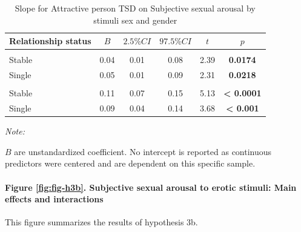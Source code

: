 \documentclass[
  bookmarksnumbered]{article}
\begin{document}
\begin{table}[H]
\centering
\caption{\label{tab:unnamed-chunk-31}Slope for Attractive person TSD on 
        Subjective sexual arousal by stimuli sex and gender}
\centering
\begin{threeparttable}
\begin{tabular}[t]{lccccc}
\toprule
Relationship status & $B$ & $2.5\% CI$ & $97.5\% CI$ & $t$ & $p$\\
\midrule
\addlinespace[0.3em]
\multicolumn{6}{l}{\cellcolor{lightgray}{Gender: Women}}\\
\hspace{1em}Stable & 0.04 & 0.01 & 0.08 & 2.39 & \textbf{0.0174}\\
\hspace{1em}Single & 0.05 & 0.01 & 0.09 & 2.31 & \textbf{0.0218}\\
\addlinespace[0.3em]
\multicolumn{6}{l}{\cellcolor{lightgray}{Gender: Men}}\\
\hspace{1em}Stable & 0.11 & 0.07 & 0.15 & 5.13 & \textbf{< 0.0001}\\
\hspace{1em}Single & 0.09 & 0.04 & 0.14 & 3.68 & \textbf{< 0.001}\\
\bottomrule
\end{tabular}
\begin{tablenotes}[para]
\item \textit{Note: } 
\item $B$ are unstandardized coefficient.
           No intercept is reported as continuous predictors were centered
           and are dependent on this specific sample.
\end{tablenotes}
\end{threeparttable}
\end{table}

\paragraph{Figure \ref{fig:fig-h3b}. Subjective sexual arousal to erotic stimuli: Main effects and interactions}\label{figure-reffigfig-h3b.-subjective-sexual-arousal-to-erotic-stimuli-main-effects-and-interactions}

This figure summarizes the results of hypothesis 3b.
\end{document}
